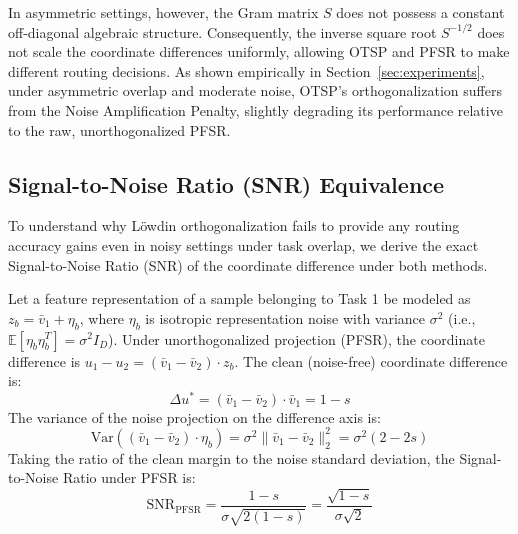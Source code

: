 In asymmetric settings, however, the Gram matrix $S$ does not possess a constant off-diagonal algebraic structure. Consequently, the inverse square root $S^{-1/2}$ does not scale the coordinate differences uniformly, allowing OTSP and PFSR to make different routing decisions. As shown empirically in Section~\ref{sec:experiments}, under asymmetric overlap and moderate noise, OTSP's orthogonalization suffers from the Noise Amplification Penalty, slightly degrading its performance relative to the raw, unorthogonalized PFSR.

\subsection{Signal-to-Noise Ratio (SNR) Equivalence}
\label{sec:snr_equivalence}
To understand why L{\"o}wdin orthogonalization fails to provide any routing accuracy gains even in noisy settings under task overlap, we derive the exact Signal-to-Noise Ratio (SNR) of the coordinate difference under both methods.

Let a feature representation of a sample belonging to Task 1 be modeled as $z_b = \bar{v}_1 + \eta_b$, where $\eta_b$ is isotropic representation noise with variance $\sigma^2$ (i.e., $\mathbb{E}[\eta_b \eta_b^T] = \sigma^2 I_D$).
Under unorthogonalized projection (PFSR), the coordinate difference is $u_1 - u_2 = (\bar{v}_1 - \bar{v}_2) \cdot z_b$. The clean (noise-free) coordinate difference is:
\begin{equation}
\Delta u^* = (\bar{v}_1 - \bar{v}_2) \cdot \bar{v}_1 = 1 - s
\end{equation}
The variance of the noise projection on the difference axis is:
\begin{equation}
\text{Var}((\bar{v}_1 - \bar{v}_2) \cdot \eta_b) = \sigma^2 \|\bar{v}_1 - \bar{v}_2\|_2^2 = \sigma^2 (2 - 2s)
\end{equation}
Taking the ratio of the clean margin to the noise standard deviation, the Signal-to-Noise Ratio under PFSR is:
\begin{equation}
\text{SNR}_{\text{PFSR}} = \frac{1-s}{\sigma \sqrt{2(1-s)}} = \frac{\sqrt{1-s}}{\sigma \sqrt{2}}
\end{equation}


